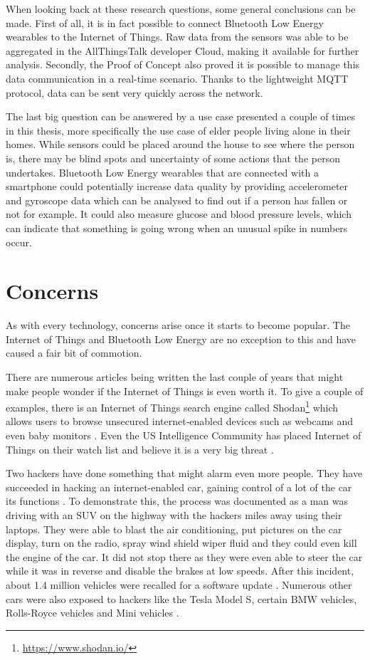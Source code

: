 \documentclass[pdftex,a4paper,12pt,twoside]{report}
\begin{document}
When looking back at these research questions, some general conclusions can be made. First of all, it is in fact possible to connect Bluetooth Low Energy wearables to the Internet of Things. Raw data from the sensors was able to be aggregated in the AllThingsTalk developer Cloud, making it available for further analysis. Secondly, the Proof of Concept also proved it is possible to manage this data communication in a real-time scenario. Thanks to the lightweight MQTT protocol, data can be sent very quickly across the network.

The last big question can be answered by a use case presented a couple of times in this thesis, more specifically the use case of elder people living alone in their homes. While sensors could be placed around the house to see where the person is, there may be blind spots and uncertainty of some actions that the person undertakes. Bluetooth Low Energy wearables that are connected with a smartphone could potentially increase data quality by providing accelerometer and gyroscope data which can be analysed to find out if a person has fallen or not for example. It could also measure glucose and blood pressure levels, which can indicate that something is going wrong when an unusual spike in numbers occur.

\section{Concerns}
\label{sec:concerns}

As with every technology, concerns arise once it starts to become popular. The Internet of Things and Bluetooth Low Energy are no exception to this and have caused a fair bit of commotion.

There are numerous articles being written the last couple of years that might make people wonder if the Internet of Things is even worth it. To give a couple of examples, there is an Internet of Things search engine called Shodan\footnote{\url{https://www.shodan.io/}} which allows users to browse unsecured internet-enabled devices such as webcams and even baby monitors \citep{porup20162, stanislav2015}. Even the US Intelligence Community has placed Internet of Things on their watch list and believe it is a very big threat \citep{clapper2016}.

Two hackers have done something that might alarm even more people. They have succeeded in hacking an internet-enabled car, gaining control of a lot of the car its functions \citep{greenberg2015}. To demonstrate this, the process was documented as a man was driving with an SUV on the highway with the hackers miles away using their laptops. They were able to blast the air conditioning, put pictures on the car display, turn on the radio, spray wind shield wiper fluid and they could even kill the engine of the car. It did not stop there as they were even able to steer the car while it was in reverse and disable the brakes at low speeds. After this incident, about 1.4 million vehicles were recalled for a software update \citep{kessler2015}. Numerous other cars were also exposed to hackers like the Tesla Model S, certain BMW vehicles, Rolls-Royce vehicles and Mini vehicles \citep{hirsch2015}.
\end{document}
